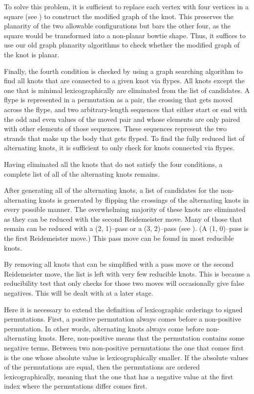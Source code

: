\begin{paper}
To solve this problem, it is sufficient to replace each vertex with four
vertices in a square (see \figGraph) to construct the modified graph of the
knot.
This preserves the planarity of the two allowable configurations but bars the
other four, as the square would be transformed into a non-planar bowtie shape.
Thus, it suffices to use our old graph planarity algorithms to check whether the
modified graph of the knot is planar.

Finally, the fourth condition is checked by using a graph searching algorithm to
find all knots that are connected to a given knot via flypes.
All knots except the one that is minimal lexicographically are eliminated from
the list of candidates.
A flype is represented in a permutation as a pair, the crossing that gets moved
across the flype, and two arbitrary-length sequences that either start or end
with the odd and even values of the moved pair and whose elements are only
paired with other elements of those sequences.
These sequences represent the two strands that make up the body that gets
flyped.
To find the fully reduced list of alternating knots, it is sufficient to only
check for knots connected via flypes.

Having eliminated all the knots that do not satisfy the four conditions, a
complete list of all of the alternating knots remains.


After generating all of the alternating knots, a list of candidates for the
non-alternating knots is generated by flipping the crossings of the alternating
knots in every possible manner.
The overwhelming majority of these knots are eliminated as they can be reduced
with the second Reidemeister move.
Many of those that remain can be reduced with a (2, 1)--pass or a (3, 2)--pass
(see \figMoves).
(A (1, 0)--pass is the first Reidemeister move.)
This pass move can be found in most reducible knots.

By removing all knots that can be simplified with a pass move or the second
Reidemeister move, the list is left with very few reducible knots.
This is because a reducibility test that only checks for those two moves will
occasionally give false negatives.
This will be dealt with at a later stage.


Here it is necessary to extend the definition of lexicographic orderings to
signed permutations.
First, a positive permutation always comes before a non-positive permutation.
In other words, alternating knots always come before non-alternating knots.
Here, non-positive means that the permutation contains some negative terms.
Between two non-positive permutations the one that comes first is the one whose
absolute value is lexicographically smaller.
If the absolute values of the permutations are equal, then the permutations are
ordered lexicographically, meaning that the one that has a negative value at the
first index where the permutations differ comes first.


\end{paper}
